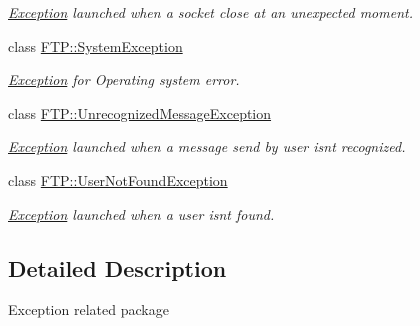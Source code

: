 \begin{DoxyCompactItemize}
\begin{DoxyCompactList}\small\item\em \hyperlink{classFTP_1_1Exception}{Exception} launched when a socket close at an unexpected moment. \end{DoxyCompactList}\item 
class \hyperlink{classFTP_1_1SystemException}{F\+T\+P\+::\+System\+Exception}
\begin{DoxyCompactList}\small\item\em \hyperlink{classFTP_1_1Exception}{Exception} for Operating system error. \end{DoxyCompactList}\item 
class \hyperlink{classFTP_1_1UnrecognizedMessageException}{F\+T\+P\+::\+Unrecognized\+Message\+Exception}
\begin{DoxyCompactList}\small\item\em \hyperlink{classFTP_1_1Exception}{Exception} launched when a message send by user isn\textquotesingle{}t recognized. \end{DoxyCompactList}\item 
class \hyperlink{classFTP_1_1UserNotFoundException}{F\+T\+P\+::\+User\+Not\+Found\+Exception}
\begin{DoxyCompactList}\small\item\em \hyperlink{classFTP_1_1Exception}{Exception} launched when a user isn\textquotesingle{}t found. \end{DoxyCompactList}\end{DoxyCompactItemize}


\subsection{Detailed Description}
Exception related package 